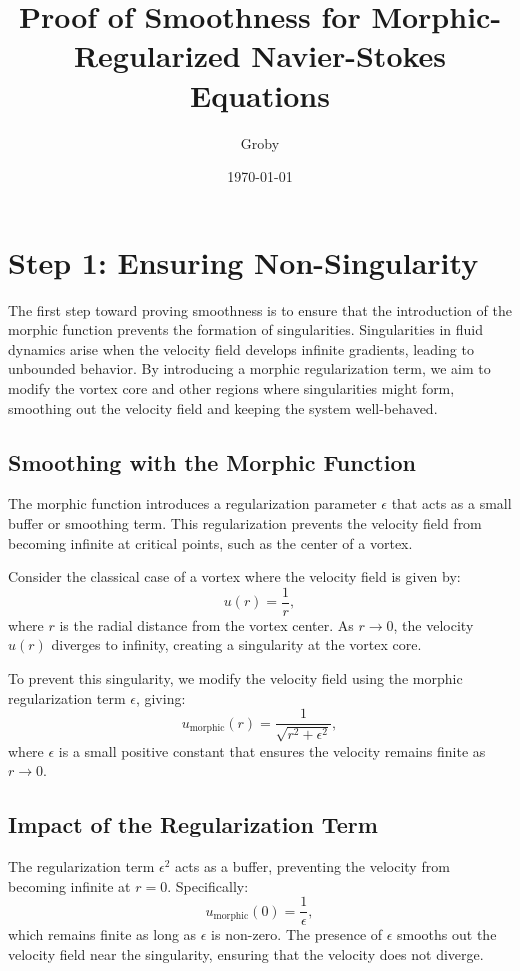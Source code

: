 \documentclass{article}
\title{Proof of Smoothness for Morphic-Regularized Navier-Stokes Equations}
\author{Groby}
\date{\today}
\begin{document}
\maketitle

\section*{Step 1: Ensuring Non-Singularity}

The first step toward proving smoothness is to ensure that the introduction of the morphic function prevents the formation of singularities. Singularities in fluid dynamics arise when the velocity field develops infinite gradients, leading to unbounded behavior. By introducing a morphic regularization term, we aim to modify the vortex core and other regions where singularities might form, smoothing out the velocity field and keeping the system well-behaved.

\subsection*{Smoothing with the Morphic Function}

The morphic function introduces a regularization parameter \( \epsilon \) that acts as a small buffer or smoothing term. This regularization prevents the velocity field from becoming infinite at critical points, such as the center of a vortex.

Consider the classical case of a vortex where the velocity field is given by:
\[
u(r) = \frac{1}{r},
\]
where \( r \) is the radial distance from the vortex center. As \( r \to 0 \), the velocity \( u(r) \) diverges to infinity, creating a singularity at the vortex core.

To prevent this singularity, we modify the velocity field using the morphic regularization term \( \epsilon \), giving:
\[
u_{\text{morphic}}(r) = \frac{1}{\sqrt{r^2 + \epsilon^2}},
\]
where \( \epsilon \) is a small positive constant that ensures the velocity remains finite as \( r \to 0 \).

\subsection*{Impact of the Regularization Term}

The regularization term \( \epsilon^2 \) acts as a buffer, preventing the velocity from becoming infinite at \( r = 0 \). Specifically:
\[
u_{\text{morphic}}(0) = \frac{1}{\epsilon},
\]
which remains finite as long as \( \epsilon \) is non-zero. The presence of \( \epsilon \) smooths out the velocity field near the singularity, ensuring that the velocity does not diverge.
\end{document}
